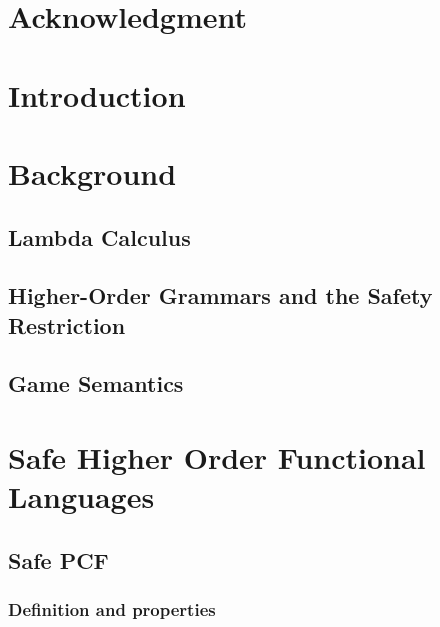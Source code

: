 \begin{romanpages}
\tableofcontents
\listoffigures
\end{romanpages}

\chapter*{Acknowledgment}
%

\chapter{Introduction}



\chapter{Background}
    \section{Lambda Calculus}
    
    
    \section{Higher-Order Grammars and the Safety Restriction}
    

    

    \section{Game Semantics}
    

\chapter{Safe Higher Order Functional Languages}
\label{chap:safelambda}
    
    
    


    
    


    \section{Safe PCF}
        \subsection{Definition and properties}
